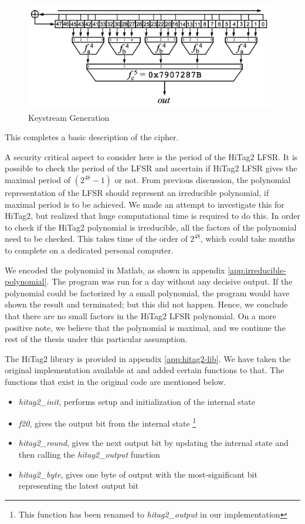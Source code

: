 \begin{figure}[ht!]
	\centering
		\includegraphics[width=4.3in]{./figures/hitag2-3.PNG}
	\caption{Keystream Generation \cite{hitag2-figure}}	
	\label{fig:hitag2-3}
\end{figure}

This completes a basic description of the cipher. 

A security critical aspect to consider here is the period of the HiTag2 LFSR. It is possible to check the period of the LFSR and ascertain if HiTag2 LFSR gives the maximal period of $(2^{48} - 1)$ or not. From previous discussion, the polynomial representation of the LFSR should represent an irreducible polynomial, if maximal period is to be achieved. We made an attempt to investigate this for HiTag2, but realized that huge computational time is required to do this. In order to check if the HiTag2 polynomial is irreducible, all the factors of the polynomial need to be checked. This takes time of the order of $2^{48}$, which could take months to complete on a dedicated personal computer.

We encoded the polynomial in Matlab, as shown in appendix \ref{app:irreducible-polynomial}. The program was run for a day without any decisive output. If the polynomial could be factorized by a small polynomial, the program would have shown the result and terminated; but this did not happen. Hence, we conclude that there are no small factors in the HiTag2 LFSR polynomial. On a more positive note, we believe that the polynomial is maximal, and we continue the rest of the thesis under this particular assumption.

The HiTag2 library is provided in appendix \ref{app:hitag2-lib}. We have taken the original implementation available at \cite{hitag2-code} and added certain functions to that. The functions that exist in the original code are mentioned below. 
\begin{itemize}
\item \textit{hitag2\_init}, performs setup and initialization of the internal state
\item \textit{f20}, gives the output bit from the internal state \footnote{This function has been renamed to \textit{hitag2\_output} in our implementation}
\item \textit{hitag2\_round}, gives the next output bit by updating the internal state and then calling the \textit{hitag2\_output} function
\item \textit{hitag2\_byte}, gives one byte of output with the most-significant bit representing the latest output bit
\end{itemize}

